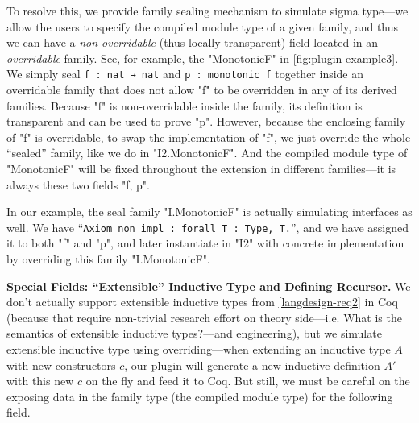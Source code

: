 To resolve this, we provide family sealing mechanism to simulate sigma type---we allow the
users to specify the compiled module type of a given family, and thus we
can have a \textit{non-overridable} (thus locally transparent) field
located in an \textit{overridable} family.
See, for example, the "MonotonicF" in \cref{fig:plugin-example3}.
We simply seal
\texttt{f : nat → nat} and \texttt{p : monotonic f}
together inside an overridable family that does not allow "f"
to be overridden in any of its derived families.
Because "f" is non-overridable inside the family, its definition is
transparent and can be used to prove "p".
However, because the enclosing family of "f" is overridable, to swap the
implementation of "f", we just override the whole ``sealed'' family,
like we do in "I2.MonotonicF". And the compiled module type of
"MonotonicF" will be fixed throughout the extension in different
families---it is always these two fields "f, p".

In our example, the seal family "I.MonotonicF" is actually simulating
interfaces as well.  We have
\mbox{``\texttt{Axiom non_impl : forall {T : Type}, T.}''},
and we have assigned it to both "f" and "p", and later instantiate in
"I2" with concrete implementation by overriding this family
"I.MonotonicF".



\textbf{Special Fields: ``Extensible'' Inductive Type and Defining Recursor.}
We don't actually support extensible inductive types from
\ref{langdesign-req2} in Coq (because that require non-trivial research
effort on theory side---i.e. {What is the semantics of extensible
inductive types?}---and engineering), but we simulate extensible
inductive type using overriding---when extending an inductive type $A$
with new constructors $c$, our plugin will generate a new inductive
definition $A'$ with this new $c$ on the fly and feed it to Coq.  But
still, we must be careful on the exposing data in the family type (the
compiled module type) for the following field.  

